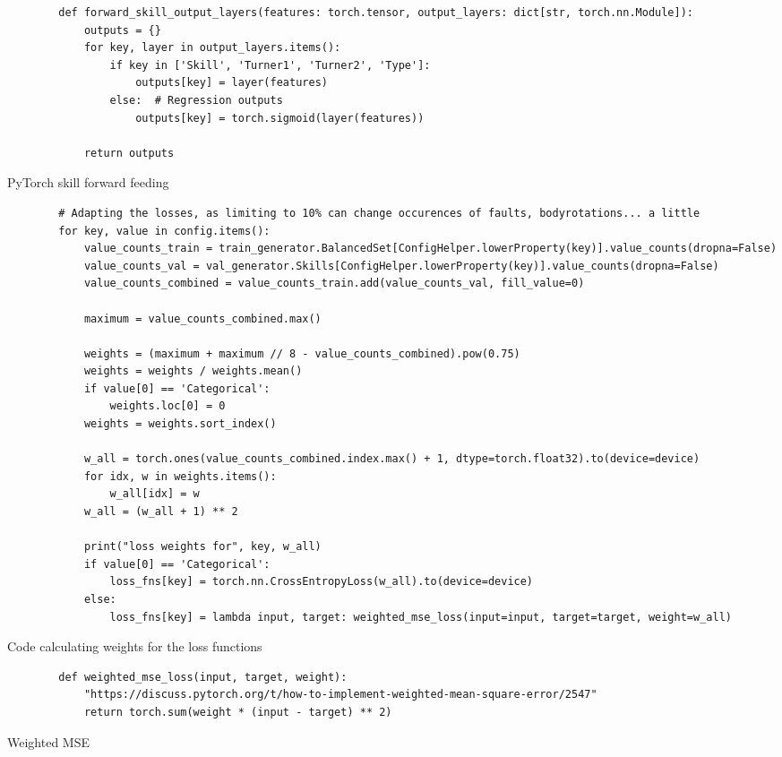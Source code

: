 \begin{listing}
    \begin{verbatim}
        def forward_skill_output_layers(features: torch.tensor, output_layers: dict[str, torch.nn.Module]):
            outputs = {}
            for key, layer in output_layers.items():
                if key in ['Skill', 'Turner1', 'Turner2', 'Type']:
                    outputs[key] = layer(features)
                else:  # Regression outputs
                    outputs[key] = torch.sigmoid(layer(features))
            
            return outputs
    \end{verbatim}
    \caption[Pytorch skill forward feed]{PyTorch skill forward feeding}
    \label{code:pytorch-skill-layers-forward}
\end{listing}

\begin{listing}
    \begin{verbatim}
        # Adapting the losses, as limiting to 10% can change occurences of faults, bodyrotations... a little
        for key, value in config.items():
            value_counts_train = train_generator.BalancedSet[ConfigHelper.lowerProperty(key)].value_counts(dropna=False)
            value_counts_val = val_generator.Skills[ConfigHelper.lowerProperty(key)].value_counts(dropna=False)
            value_counts_combined = value_counts_train.add(value_counts_val, fill_value=0)
        
            maximum = value_counts_combined.max()
        
            weights = (maximum + maximum // 8 - value_counts_combined).pow(0.75)
            weights = weights / weights.mean()
            if value[0] == 'Categorical':
                weights.loc[0] = 0
            weights = weights.sort_index()
        
            w_all = torch.ones(value_counts_combined.index.max() + 1, dtype=torch.float32).to(device=device)
            for idx, w in weights.items():
                w_all[idx] = w
            w_all = (w_all + 1) ** 2
        
            print("loss weights for", key, w_all)
            if value[0] == 'Categorical':
                loss_fns[key] = torch.nn.CrossEntropyLoss(w_all).to(device=device)
            else:
                loss_fns[key] = lambda input, target: weighted_mse_loss(input=input, target=target, weight=w_all)
    \end{verbatim}
    \caption[Code calculating weights for the loss functions]{Code calculating weights for the loss functions}
    \label{code:recognition-weighted-loss}
\end{listing}

\begin{listing}
    \begin{verbatim}
        def weighted_mse_loss(input, target, weight):
            "https://discuss.pytorch.org/t/how-to-implement-weighted-mean-square-error/2547"
            return torch.sum(weight * (input - target) ** 2)
    \end{verbatim}
    \caption[Weihted MSE]{Weighted MSE}
    \label{code:weighted-mse}
\end{listing}

